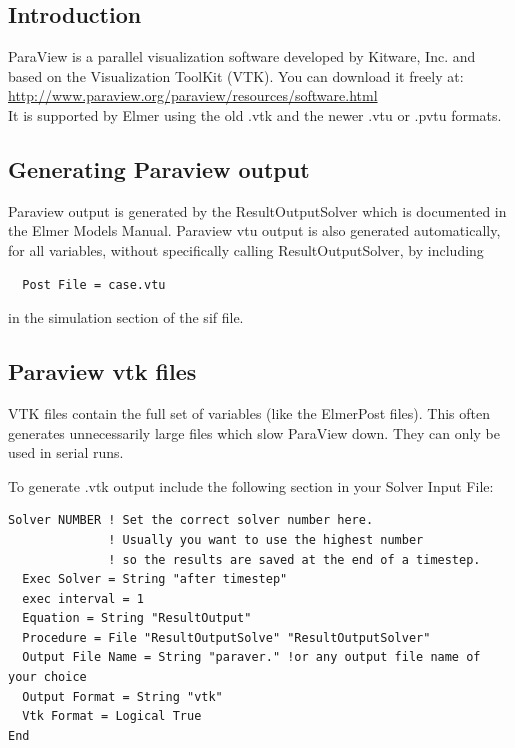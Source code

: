 \subsection{Introduction}

ParaView is a parallel visualization software developed by Kitware, Inc. and based on the Visualization ToolKit (VTK). You can download it freely at:\\

\url{http://www.paraview.org/paraview/resources/software.html}\\

\noindent It is supported by Elmer using the old .vtk and the newer .vtu or .pvtu formats. 

\subsection{Generating Paraview output}

Paraview output is generated by the ResultOutputSolver which is documented in the Elmer Models Manual.  Paraview vtu output is also generated automatically, for all variables, without specifically calling ResultOutputSolver, by including 

\begin{verbatim}
  Post File = case.vtu
\end{verbatim}
 \noindent in the simulation section of the sif file.

\subsection{Paraview vtk files}

VTK files contain the full set of variables (like the ElmerPost files). This often generates unnecessarily large files which slow ParaView down. They can only be used in serial runs.

To generate .vtk output include the following section in your Solver Input File:

\begin{verbatim}
Solver NUMBER ! Set the correct solver number here.
              ! Usually you want to use the highest number
              ! so the results are saved at the end of a timestep.
  Exec Solver = String "after timestep"	
  exec interval = 1
  Equation = String "ResultOutput"
  Procedure = File "ResultOutputSolve" "ResultOutputSolver"
  Output File Name = String "paraver." !or any output file name of your choice
  Output Format = String "vtk"
  Vtk Format = Logical True
End
\end{verbatim}


